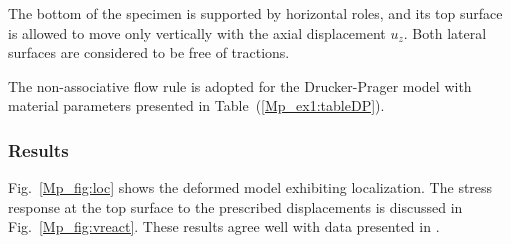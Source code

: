 The bottom of the specimen is supported by horizontal roles, and its top surface is allowed to move only vertically with the axial displacement $u_z$. Both lateral surfaces are considered to be free of tractions.

The non-associative flow rule is adopted for the Drucker-Prager model with material parameters presented in Table~(\ref{Mp_ex1:tableDP}).

\subsubsection{Results}
\label{subsubsec:Mp2_res}

Fig.~\ref{Mp_fig:loc} shows the deformed model exhibiting localization. The stress response at the top surface to the prescribed displacements is discussed in Fig.~\ref{Mp_fig:vreact}. These results agree well with data presented in \cite{Bo00}.

